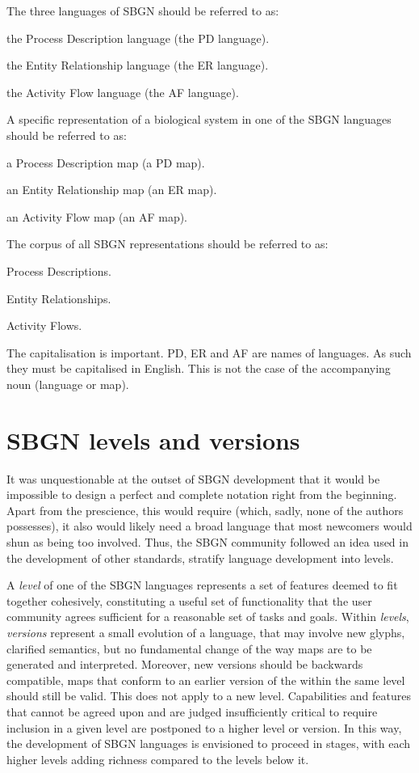 The three languages of SBGN should be referred to as:
\begin{compactitem}
\item the Process Description language (the PD language).
\item the Entity Relationship language (the ER language).
\item the Activity Flow language  (the AF language).
\end{compactitem}
A specific representation of a biological system in one of the SBGN languages should be referred to as:
\begin{compactitem}
\item a Process Description map (a PD map).
\item an Entity Relationship map (an ER map).
\item an Activity Flow map (an AF map).
\end{compactitem}
The corpus of all SBGN representations should be referred to as:
\begin{compactitem}
\item Process Descriptions.
\item Entity Relationships.
\item Activity Flows.
\end{compactitem}
The capitalisation is important. PD, ER and AF are names of languages. 
As such they must be capitalised in English. This is not the case of the accompanying noun (language or map).



\section{SBGN levels and versions}
\label{sec:sbgn-levels}

It was unquestionable at the outset of SBGN development that it would be impossible 
to design a perfect and complete notation right from the beginning.  Apart 
from the prescience, this would require (which, sadly, none of the authors 
possesses), it also would likely need a broad language that most newcomers 
would shun as being too involved.  Thus, the SBGN community followed an idea 
used in the development of other standards, \ie stratify language 
development into levels.

A \emph{level} of one of the SBGN languages represents a set of features 
deemed to fit together cohesively, constituting a useful set of 
functionality that the user community agrees sufficient for a reasonable 
set of tasks and goals. Within \emph{levels}, \emph{versions} represent 
a small evolution of a language, that may involve new glyphs, clarified 
semantics, but no fundamental change of the way maps are to be generated 
and interpreted. Moreover, new versions should be backwards compatible, 
\ie \PD maps that conform to an earlier version of the \PDl within 
the same level should still be valid. This does not apply to a new level.
Capabilities and features that cannot be agreed upon and 
are judged insufficiently critical to require inclusion in a given level 
are postponed to a higher level or version.  In this way, the development 
of SBGN languages is envisioned to proceed in stages, with each higher 
levels adding richness compared to the levels below it.



